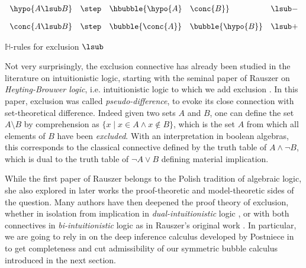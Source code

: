 \begin{marginfigure}
  $$
  \begin{array}{rclr}
    \hypo{A \lsub B} &\step &\hbubble{\hypo{A}~~~\conc{B}} &{\lsub}{-}\vspace{1em}\\
    \conc{A \lsub B} &\step &{\bubble{\conc{A}}}~~~\bubble{\hypo{B}} &{\lsub}{+}
  \end{array}
  $$
  \caption{$\mathbb{H}$-rules for exclusion $\lsub$}
\end{marginfigure}

Not very surprisingly, the exclusion connective has already been studied in the
literature on intuitionistic logic, starting with the seminal paper of Rauszer
on \emph{Heyting-Brouwer logic}, i.e. intuitionistic logic to which we add
exclusion . In this paper, exclusion was called
\emph{pseudo-difference}, to evoke its close connection with set-theoretical
difference. Indeed given two sets $A$ and $B$, one can define the set $A
\setminus B$ by comprehension as $\{x \mid x \in A \land x \not\in B\}$, which
is the set $A$ from which all elements of $B$ have been \emph{excluded}. With an
interpretation in boolean algebras, this corresponds to the classical connective
defined by the truth table of $A \land \neg B$, which is dual to the truth table
of $\neg A \lor B$ defining material implication.

While the first paper of Rauszer \cite{Rauszer1974-RAUSAA} belongs to the Polish
tradition of algebraic logic, she also explored in later works the
proof-theoretic  and model-theoretic
 sides of the question. Many authors have
then deepened the proof theory of exclusion, whether in isolation from
implication in \emph{dual-intuitionistic} logic
, or with both
connectives in \emph{bi-intuitionistic} logic as in Rauszer's original
work
. In particular, we
are going to rely in  on the deep inference
calculus developed by Postniece in \cite{postniece_deep_2009} to get
completeness and cut admissibility of our symmetric bubble calculus introduced
in the next section.

